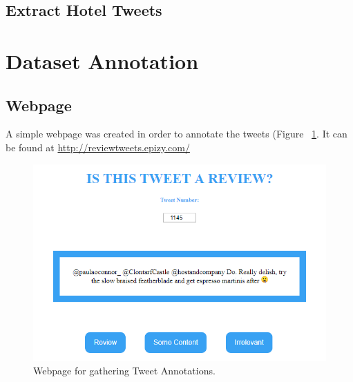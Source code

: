 \subsection*{Extract Hotel Tweets}

\section{Dataset Annotation}

\subsection*{Webpage}

A simple webpage was created in order to annotate the tweets (Figure ~\ref{fig:webpage}. \newline
It can be found at \url{http://reviewtweets.epizy.com/}

\begin{figure}[h!]
\centering
\includegraphics[width=1\textwidth]{project/webpage.PNG}
\caption{\label{fig:webpage} Webpage for gathering Tweet Annotations.}
\end{figure}

